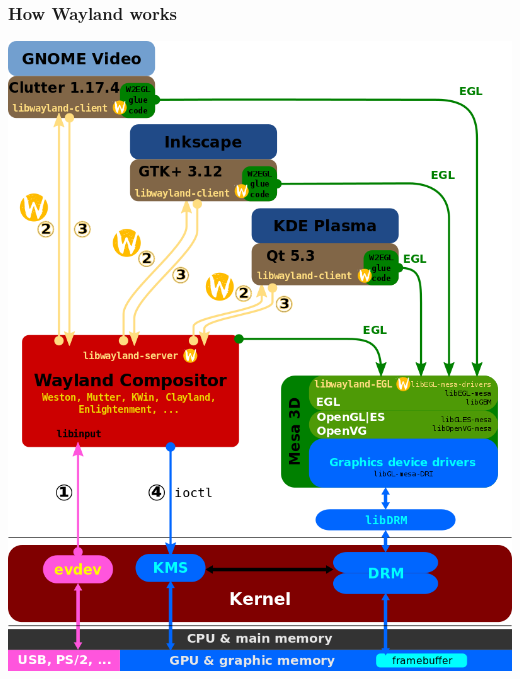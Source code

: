 \documentclass{beamer}
\begin{document}
\begin{frame}
  \frametitle{How Wayland works}
  \centering
  \includegraphics[height=0.85\textheight]{Wayland_Diagram.png}
\end{frame}
\end{document}
